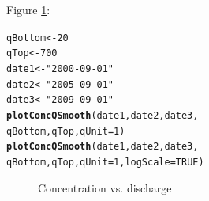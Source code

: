 \documentclass[a4paper,11pt]{article}\usepackage[]{graphicx}\usepackage[]{color}
\makeatletter
\newcommand{\hlnum}[1]{\textcolor[rgb]{0.686,0.059,0.569}{#1}}%
\newcommand{\hlstr}[1]{\textcolor[rgb]{0.192,0.494,0.8}{#1}}%
\newcommand{\hlstd}[1]{\textcolor[rgb]{0.345,0.345,0.345}{#1}}%
\newcommand{\hlkwb}[1]{\textcolor[rgb]{0.69,0.353,0.396}{#1}}%
\newcommand{\hlkwc}[1]{\textcolor[rgb]{0.333,0.667,0.333}{#1}}%
\newcommand{\hlkwd}[1]{\textcolor[rgb]{0.737,0.353,0.396}{\textbf{#1}}}%
\newenvironment{kframe}{%
 \def\at@end@of@kframe{}%
 \ifinner\ifhmode%
  \def\at@end@of@kframe{\end{minipage}}%
  \begin{minipage}{\columnwidth}%
 \fi\fi%
 \def\FrameCommand##1{\hskip\@totalleftmargin \hskip-\fboxsep
 \colorbox{shadecolor}{##1}\hskip-\fboxsep
     \hskip-\linewidth \hskip-\@totalleftmargin \hskip\columnwidth}%
 \MakeFramed {\advance\hsize-\width
   \@totalleftmargin\z@ \linewidth\hsize
   \@setminipage}}%
 {\par\unskip\endMakeFramed%
 \at@end@of@kframe}
\newenvironment{knitrout}{}{} %
\makeatother
\begin{document}
Figure \ref{fig:plotConcQSmooth}:
\begin{knitrout}
\color{fgcolor}\begin{kframe}
\begin{alltt}
\hlstd{qBottom}\hlkwb{<-}\hlnum{20}
\hlstd{qTop}\hlkwb{<-}\hlnum{700}
\hlstd{date1} \hlkwb{<-} \hlstr{"2000-09-01"}
\hlstd{date2} \hlkwb{<-} \hlstr{"2005-09-01"}
\hlstd{date3} \hlkwb{<-} \hlstr{"2009-09-01"}
\hlkwd{plotConcQSmooth}\hlstd{(date1, date2, date3,}
                \hlstd{qBottom, qTop,} \hlkwc{qUnit}\hlstd{=}\hlnum{1}\hlstd{)}
\hlkwd{plotConcQSmooth}\hlstd{(date1, date2, date3,}
                \hlstd{qBottom, qTop,} \hlkwc{qUnit}\hlstd{=}\hlnum{1}\hlstd{,}\hlkwc{logScale}\hlstd{=}\hlnum{TRUE}\hlstd{)}
\end{alltt}
\end{kframe}\begin{figure}[]
\caption[Concentration vs]{Concentration vs. discharge\label{fig:plotConcQSmooth}}
\end{figure}


\end{knitrout}
\end{document}
